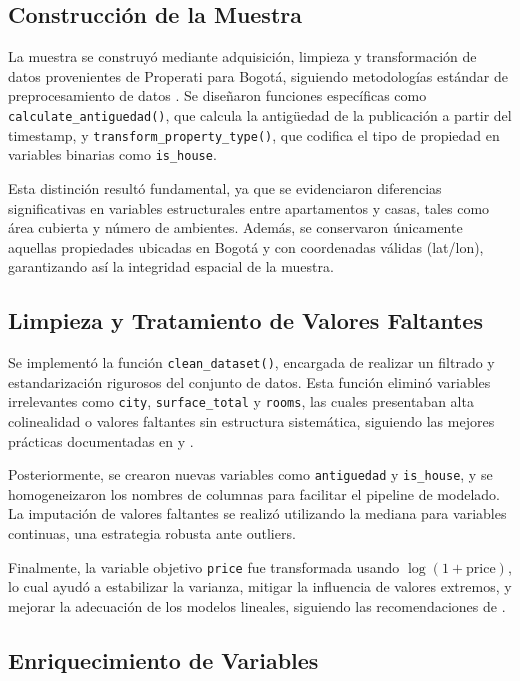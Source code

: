 \documentclass[12pt,a4paper,onecolumn]{article}
\begin{document}
\subsection{Construcción de la Muestra}

La muestra se construyó mediante adquisición, limpieza y transformación de datos provenientes de Properati para Bogotá, siguiendo metodologías estándar de preprocesamiento de datos \citep{data_cleaning_tidyverse}. Se diseñaron funciones específicas como \texttt{calculate\_antiguedad()}, que calcula la antigüedad de la publicación a partir del timestamp, y \texttt{transform\_property\_type()}, que codifica el tipo de propiedad en variables binarias como \texttt{is\_house}.

Esta distinción resultó fundamental, ya que se evidenciaron diferencias significativas en variables estructurales entre apartamentos y casas, tales como área cubierta y número de ambientes. Además, se conservaron únicamente aquellas propiedades ubicadas en Bogotá y con coordenadas válidas (lat/lon), garantizando así la integridad espacial de la muestra.

\subsection{Limpieza y Tratamiento de Valores Faltantes}

Se implementó la función \texttt{clean\_dataset()}, encargada de realizar un filtrado y estandarización rigurosos del conjunto de datos. Esta función eliminó variables irrelevantes como \texttt{city}, \texttt{surface\_total} y \texttt{rooms}, las cuales presentaban alta colinealidad o valores faltantes sin estructura sistemática, siguiendo las mejores prácticas documentadas en \citet{missing_values_part1} y \citet{missing_values_part2}.

Posteriormente, se crearon nuevas variables como \texttt{antiguedad} y \texttt{is\_house}, y se homogeneizaron los nombres de columnas para facilitar el pipeline de modelado. La imputación de valores faltantes se realizó utilizando la mediana para variables continuas, una estrategia robusta ante outliers.

Finalmente, la variable objetivo \texttt{price} fue transformada usando $\log(1 + \text{price})$, lo cual ayudó a estabilizar la varianza, mitigar la influencia de valores extremos, y mejorar la adecuación de los modelos lineales, siguiendo las recomendaciones de \citet{james2021introduction}.

\subsection{Enriquecimiento de Variables}
\end{document}
